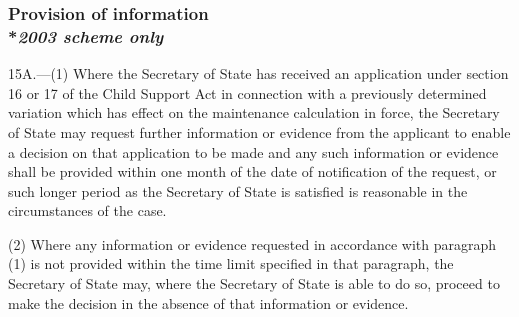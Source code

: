 \documentclass[12pt,a4paper]{article}
\begin{document}
\subsubsection[15A. Provision of information]{Provision of information\\*\emph{2003 scheme only}}

15A.---(1)  Where the 
Secretary of State  %
has received an application under section 16 or 17 of the Child Support Act in connection with a previously determined variation which has effect on the maintenance calculation in force, 
the Secretary of State  %
may request further information or evidence from the applicant to enable a decision on that application to be made and any such information or evidence shall be provided within one month of the date of notification of the request, or such longer period as the 
Secretary of State  %
is satisfied is reasonable in the circumstances of the case.

(2) Where any information or evidence requested in accordance with paragraph (1) is not provided within the time limit specified in that paragraph, the 
Secretary of State  %
may, where 
the Secretary of State  %
is able to do so, proceed to make the decision in the absence of that information or evidence.

\end{document}
